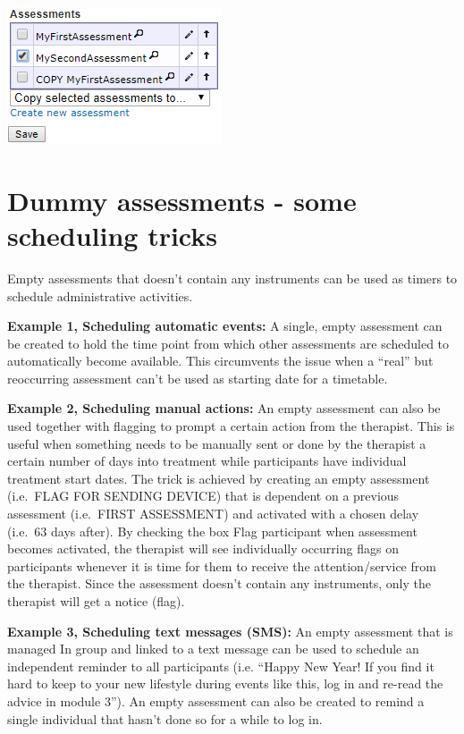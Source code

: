 \documentclass[]{book}
\begin{document}
\includegraphics{images/copy-assessment.png}

\hypertarget{dummy-assessments---some-scheduling-tricks}{%
\section{Dummy assessments - some scheduling tricks}\label{dummy-assessments---some-scheduling-tricks}}

Empty assessments that doesn't contain any instruments can be used as timers to schedule administrative activities.

\textbf{Example 1, Scheduling automatic events:} A single, empty assessment can be created to hold the time point from which other assessments are scheduled to automatically become available. This circumvents the issue when a ``real'' but reoccurring assessment can't be used as starting date for a timetable.

\textbf{Example 2, Scheduling manual actions:} An empty assessment can also be used together with flagging to prompt a certain action from the therapist. This is useful when something needs to be manually sent or done by the therapist a certain number of days into treatment while participants have individual treatment start dates. The trick is achieved by creating an empty assessment (i.e.~FLAG FOR SENDING DEVICE) that is dependent on a previous assessment (i.e.~FIRST ASSESSMENT) and activated with a chosen delay (i.e.~63 days after). By checking the box Flag participant when assessment becomes activated, the therapist will see individually occurring flags on participants whenever it is time for them to receive the attention/service from the therapist. Since the assessment doesn't contain any instruments, only the therapist will get a notice (flag).

\textbf{Example 3, Scheduling text messages (SMS):} An empty assessment that is managed In group and linked to a text message can be used to schedule an independent reminder to all participants (i.e. ``Happy New Year! If you find it hard to keep to your new lifestyle during events like this, log in and re-read the advice in module 3''). An empty assessment can also be created to remind a single individual that hasn't done so for a while to log in.
\end{document}
